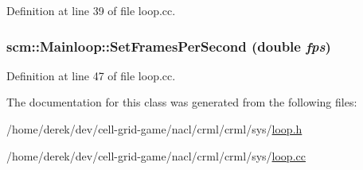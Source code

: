 Definition at line 39 of file loop.cc.

\hypertarget{classscm_1_1_mainloop_a47a4747a4529b29b2337942496bc4e61}{
\subsubsection[{SetFramesPerSecond}]{ scm::Mainloop::SetFramesPerSecond (double {\em fps})}}
\label{classscm_1_1_mainloop_a47a4747a4529b29b2337942496bc4e61}


Definition at line 47 of file loop.cc.



The documentation for this class was generated from the following files:\begin{DoxyCompactItemize}
\item 
/home/derek/dev/cell-\/grid-\/game/nacl/crml/crml/sys/\hyperlink{loop_8h}{loop.h}\item 
/home/derek/dev/cell-\/grid-\/game/nacl/crml/crml/sys/\hyperlink{loop_8cc}{loop.cc}\end{DoxyCompactItemize}
